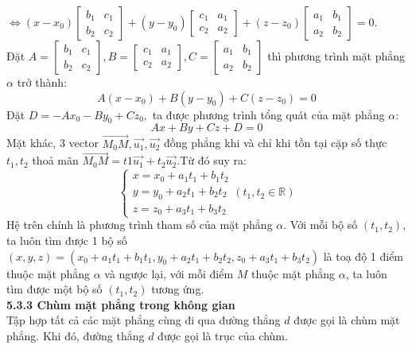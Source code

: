 \documentclass[12pt,a4]{article}
\begin{document}
\begin{titlepage}
\[\]
$\Leftrightarrow (x - x_0)\begin{bmatrix} b_1&c_1\\b_2&c_2 \end{bmatrix} + (y - y_0)\begin{bmatrix} c_1&a_1\\c_2&a_2\end{bmatrix} + (z - z_0)\begin{bmatrix} a_1&b_1\\a_2&b_2\end{bmatrix} = 0.$\\
Đặt $A = \begin{bmatrix} b_1 &c_1\\b_2&c_2\end{bmatrix}, B = \begin{bmatrix} c_1 &a_1\\c_2&a_2\end{bmatrix}, C = \begin{bmatrix} a_1 &b_1\\a_2&b_2\end{bmatrix}$ thì phương trình mặt phẳng $\alpha$ trở thành:
\[
A(x - x_0) + B(y - y_0) + C(z - z_0) = 0
\]
Đặt $D = -Ax_0 - By_0 + Cz_0,$ ta được phương trình tổng quát của mặt phẳng $\alpha:$
\[
Ax + By + Cz + D = 0
\]
Mặt khác, 3 vector $\overrightarrow{M_0M},\vec{u_1},\vec{u_2}$ đồng phẳng khi và chỉ khi tồn tại cặp số thực $t_1,t_2$ thoả mãn $\overrightarrow{M_0M} = t1\vec{u_1} + t_2\vec{u_2}. $Từ đó suy ra:
\[
\begin{cases}x = x_0 + a_1t_1 + b_1t_2\\y = y_0 + a_2t_1 + b_2t_2\\z = z_0 + a_3t_1 + b_3t_2 \end{cases} (t_1,t_2 \in \mathbb{R})
\]
Hệ trên chính là phương trình tham số của mặt phẳng $\alpha$. Với mỗi bộ số $(t_1,t_2)$, ta luôn tìm được 1 bộ số $(x,y,z) = (x_0 + a_1t_1 + b_1t_1,y_0 + a_2t_1 + b_2t_2,z_0 + a_3t_1 + b_3t_2)$ là toạ độ 1 điểm thuộc mặt phẳng $\alpha$ và ngược lại, với mỗi điểm $M$ thuộc mặt phẳng $\alpha$, ta luôn tìm được một bộ số $(t_1,t_2)$ tương ứng.\\
\vspace{0.2cm}
\textbf{5.3.3 Chùm mặt phẳng trong không gian}\\
\vspace{0.2cm}
Tập hợp tất cả các mặt phẳng cùng đi qua đường thẳng $d$ được gọi là chùm mặt phẳng. Khi đó, đường thẳng $d$ được gọi là trục của chùm.\\
\begin{center}


\end{center}
\end{titlepage}
\end{document}
